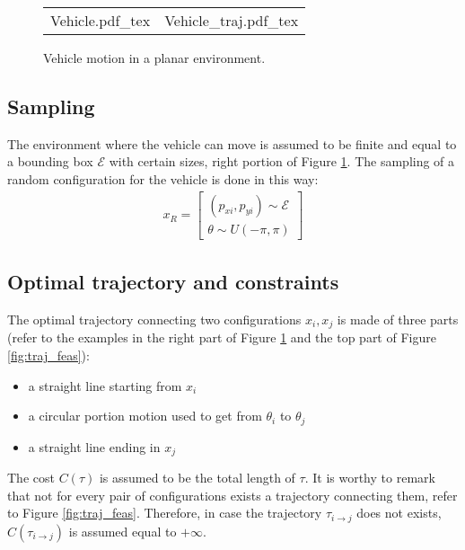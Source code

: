  \begin{figure}
\begin{tabular}{cc}
\begin{minipage}[t]{0.49\textwidth}
	 \centering
 \def\svgwidth{0.85 \columnwidth}
 {Vehicle.pdf_tex} 
\end{minipage}
 & 
\begin{minipage}[t]{0.49\textwidth}
	 \centering
 \def\svgwidth{0.85 \columnwidth}
 {Vehicle_traj.pdf_tex} 
\end{minipage}
\end{tabular} 
	 \caption{Vehicle motion in a planar environment.}
 \label{fig:vehicle}
 \end{figure}
 
\subsection{Sampling}

The environment where the vehicle can move is assumed to be finite and equal to a bounding box $\mathcal{E}$ with certain sizes, right portion of Figure \ref{fig:vehicle}. The sampling of a random configuration for the vehicle is done in this way:
\begin{eqnarray}
x_R = \begin{bmatrix} (p_{xi} , p_{yi}) \sim \mathcal{E} \\ \theta \sim U(-\pi, \pi) \end{bmatrix}
\end{eqnarray}

\subsection{Optimal trajectory and constraints}

The optimal trajectory connecting two configurations $x_i, x_j$ is made of three parts (refer to the examples in the right part of Figure \ref{fig:vehicle} and the top part of Figure \ref{fig:traj_feas}):
\begin{itemize}
\item a straight line starting from $x_i$
\item a circular portion motion used to get from $\theta_i$ to $\theta_j$
\item a straight line ending in $x_j$
\end{itemize}
The cost $C(\tau)$ is assumed to be the total length of $\tau$. It is worthy to remark that not for every pair of configurations exists a trajectory connecting them, refer to Figure \ref{fig:traj_feas}. Therefore, in case the trajectory $\tau_{i \rightarrow j}$ does not exists, $C(\tau_{i \rightarrow j})$ is assumed equal to $+\infty$.

